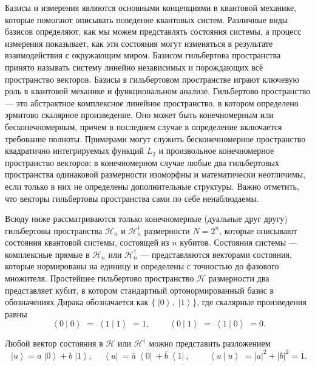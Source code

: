 \documentclass[a4paper]{report}
\newcommand{\ket}[1] {\!\!\;\ensuremath{\left|#1\right\rangle}}
\newcommand{\bra}[1] {\!\!\:\ensuremath{\left\langle#1\right|\!\!\:}}
\newcommand{\braket}[2]{\ensuremath {\!\!\:\left\langle#1\!\!\: \left|\!\!\!\;\right.#2\right\rangle\!\!\;}}
\begin{document}
Базисы и измерения являются основными концепциями в квантовой механике, которые помогают описывать поведение квантовых систем. Различные виды базисов определяют, как мы можем представлять состояния системы, а процесс измерения показывает, как эти состояния могут изменяться в результате взаимодействия с окружающим миром. Базисом гильбертова пространства принято называть систему линейно независимых и порождающих всё пространство векторов. Базисы в гильбертовом пространстве играют ключевую роль в квантовой механике и функциональном анализе. Гильбертово пространство --- это абстрактное комплексное линейное пространство, в котором определено эрмитово скалярное произведение. Оно может быть конечномерным или бесконечномерным, причем в последнем случае в определение включается требование полноты. Примерами могут служить бесконечномерное пространство квадратично интегрируемых функций ${L_2}$ и произвольное конечномерное пространство векторов; в конечномерном случае любые два гильбертовых пространства одинаковой размерности изоморфны и математически неотличимы, если только в них не определены дополнительные структуры. Важно отметить, что векторы гильбертовы пространства сами по себе ненаблюдаемы.

Всюду ниже рассматриваются только конечномерные (дуальные друг другу) гильбертовы пространства $\mathcal{H}_n$ и $\mathcal{H}_n^\dag$ размерности $N=2^n$, которые описывают состояния квантовой системы, состоящей из $n$ кубитов. Состояния системы --- комплексные прямые в $\mathcal{H}_n$ или $\mathcal{H}_n^\dag$ --- представляются векторами состояния, которые нормированы на единицу и определены с точностью до фазового множителя. Простейшее гильбертово пространство $\mathcal{H}$ размерности два представляет кубит, в котором стандартный ортонормированный базис в обозначениях Дирака обозначается как $\{\ket{0},\ket{1}\}$, где скалярные произведения равны
\begin{equation}\label{}
\braket{0}{0}=\braket{1}{1}=1, \qquad \braket{0}{1}=\braket{1}{0}=0.
\nonumber
\end{equation}

Любой вектор состояния в $\mathcal{H}$ или $\mathcal{H}^\dag$ можно представить разложением
\begin{equation}\label{}
\ket{u}=a\ket{0}+b\ket{1},\quad \bra{u}=\bar{a}\bra{0}+\bar{b}\bra{1},\qquad \braket{u}{u}=|a|^2+|b|^2=1.
\nonumber
\end{equation}
\end{document}
